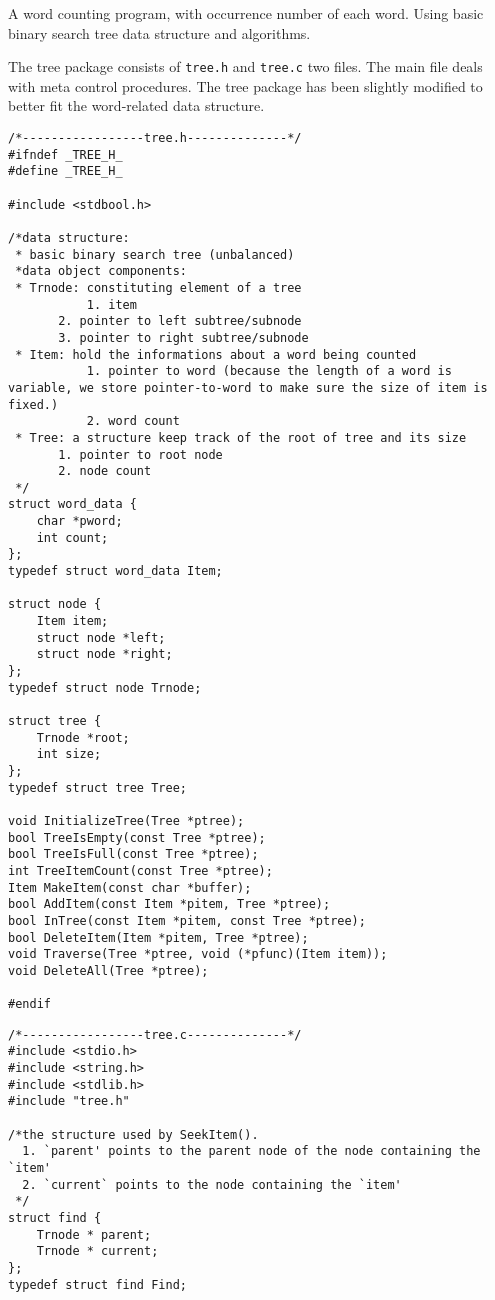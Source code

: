 \begin{question}
  A word counting program, with occurrence number of each word.
  Using basic binary search tree data structure and algorithms.
\end{question}
\begin{solution}
  The tree package consists of \verb|tree.h| and \verb|tree.c| two files. The main file deals with meta control procedures. The tree package has been slightly modified to better fit the word-related data structure.
  \begin{verbatim}
/*-----------------tree.h--------------*/
#ifndef _TREE_H_
#define _TREE_H_

#include <stdbool.h>

/*data structure:
 * basic binary search tree (unbalanced)
 *data object components:
 * Trnode: constituting element of a tree
    	   1. item
	   2. pointer to left subtree/subnode
	   3. pointer to right subtree/subnode
 * Item: hold the informations about a word being counted
           1. pointer to word (because the length of a word is variable, we store pointer-to-word to make sure the size of item is fixed.)
           2. word count
 * Tree: a structure keep track of the root of tree and its size  	   
 	   1. pointer to root node
   	   2. node count
 */
struct word_data {
	char *pword;
	int count;
};
typedef struct word_data Item;

struct node {
	Item item;
	struct node *left;
	struct node *right;
};
typedef struct node Trnode;

struct tree {
	Trnode *root;
	int size;
};
typedef struct tree Tree;

void InitializeTree(Tree *ptree);
bool TreeIsEmpty(const Tree *ptree);
bool TreeIsFull(const Tree *ptree);
int TreeItemCount(const Tree *ptree);
Item MakeItem(const char *buffer);
bool AddItem(const Item *pitem, Tree *ptree);
bool InTree(const Item *pitem, const Tree *ptree);
bool DeleteItem(Item *pitem, Tree *ptree);
void Traverse(Tree *ptree, void (*pfunc)(Item item));
void DeleteAll(Tree *ptree);

#endif
  \end{verbatim}
  \begin{verbatim}
/*-----------------tree.c--------------*/
#include <stdio.h>
#include <string.h>
#include <stdlib.h>
#include "tree.h"

/*the structure used by SeekItem().
  1. `parent' points to the parent node of the node containing the `item'
  2. `current` points to the node containing the `item'
 */
struct find {
	Trnode * parent;
	Trnode * current;
};
typedef struct find Find;


\end{verbatim}
\end{solution}
